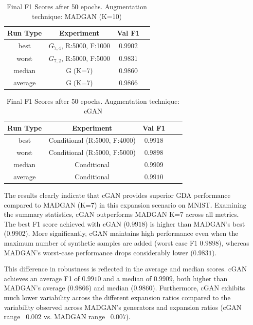 \begin{table}[H]
	\vspace{-1.5em}
	\centering
	\begin{tabular}{|c|c|c|c|}
		\hline
		Run Type & Experiment & Val F1 \\ \hline
		best & \(G_{7, 4}\), R:5000, F:1000 & $0.9902$\\ \hline
		worst & \(G_{7, 2}\), R:5000, F:5000 & $0.9831$\\ \hline
		median & G (K=7) & $0.9860$\\ \hline
		average & G (K=7) & $0.9866$
		\\ \hline
	\end{tabular}
    \caption{Final F1 Scores after 50 epochs. Augmentation technique: MADGAN (K=10)}
        \label{tab:res_expansion_mnist_ccgan_vs_madgan__madgan}
\end{table}
\begin{table}[H]
	\centering
	\vspace{-1.5em}
	\begin{tabular}{|c|c|c|c|c|}
		\hline
		Run Type & Experiment & Val F1 \\ \hline
		best & Conditional (R:5000, F:4000) & $0.9918$\\ \hline
		worst & Conditional (R:5000, F:5000) & $0.9898$\\ \hline
		median & Conditional & $0.9909$\\ \hline
		average & Conditional & $0.9910$
		\\ \hline
	\end{tabular}
    \caption{Final F1 Scores after 50 epochs. Augmentation technique: cGAN}
        \label{tab:res_expansion_mnist_ccgan_vs_madgan__cgan}
\end{table}

The results clearly indicate that cGAN provides superior GDA performance compared to MADGAN (K=7) in this expansion scenario on MNIST. Examining the summary statistics, cGAN outperforms MADGAN K=7 across all metrics. The best F1 score achieved with cGAN ($0.9918$) is higher than MADGAN's best ($0.9902$). More significantly, cGAN maintains high performance even when the maximum number of synthetic samples are added (worst case F1 $0.9898$), whereas MADGAN's worst-case performance drops considerably lower ($0.9831$).

This difference in robustness is reflected in the average and median scores. cGAN achieves an average F1 of $0.9910$ and a median of $0.9909$, both higher than MADGAN's average (0.9866) and median ($0.9860$). Furthermore, cGAN exhibits much lower variability across the different expansion ratios compared to the variability observed across MADGAN's generators and expansion ratios (cGAN range ~$0.002$ vs. MADGAN range ~$0.007$).

